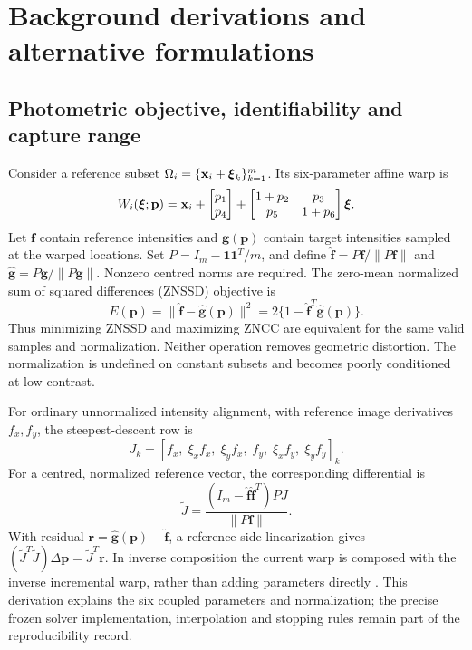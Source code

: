 \section{Background derivations and alternative formulations}
\subsection{Photometric objective, identifiability and capture range}
Consider a reference subset $\Omega_i=\{\mathbf x_i+\boldsymbol\xi_k\}_{k=1}^m$. Its six-parameter affine warp is
\begin{equation}
W_i(\boldsymbol\xi;\mathbf p)=\mathbf x_i+
\begin{bmatrix}p_1\\p_4\end{bmatrix}+
\begin{bmatrix}1+p_2&p_3\\p_5&1+p_6\end{bmatrix}\boldsymbol\xi.
\label{eq:warp}
\end{equation}
Let $\mathbf f$ contain reference intensities and $\mathbf g(\mathbf p)$ contain target intensities sampled at the warped locations. Set $P=I_m-\mathbf1\mathbf1^T/m$, and define $\widehat{\mathbf f}=P\mathbf f/\|P\mathbf f\|$ and $\widehat{\mathbf g}=P\mathbf g/\|P\mathbf g\|$. Nonzero centred norms are required. The zero-mean normalized sum of squared differences (ZNSSD) objective is
\begin{equation}
E(\mathbf p)=\|\widehat{\mathbf f}-\widehat{\mathbf g}(\mathbf p)\|^2
=2\{1-\widehat{\mathbf f}^T\widehat{\mathbf g}(\mathbf p)\}.
\label{eq:znssd}
\end{equation}
Thus minimizing ZNSSD and maximizing ZNCC are equivalent for the same valid samples and normalization. Neither operation removes geometric distortion. The normalization is undefined on constant subsets and becomes poorly conditioned at low contrast.

For ordinary unnormalized intensity alignment, with reference image derivatives $f_x,f_y$, the steepest-descent row is
\begin{equation}
J_k=[f_x,\;\xi_x f_x,\;\xi_y f_x,\;f_y,\;\xi_x f_y,\;\xi_y f_y]_k.
\end{equation}
For a centred, normalized reference vector, the corresponding differential is
\begin{equation}
\widetilde J=\frac{(I_m-\widehat{\mathbf f}\widehat{\mathbf f}^T)P J}{\|P\mathbf f\|}.
\end{equation}
With residual $\mathbf r=\widehat{\mathbf g}(\mathbf p)-\widehat{\mathbf f}$, a reference-side linearization gives $(\widetilde J^T\widetilde J)\Delta\mathbf p=\widetilde J^T\mathbf r$. In inverse composition the current warp is composed with the inverse incremental warp, rather than adding parameters directly \citep{baker,panfast}. This derivation explains the six coupled parameters and normalization; the precise frozen solver implementation, interpolation and stopping rules remain part of the reproducibility record.

